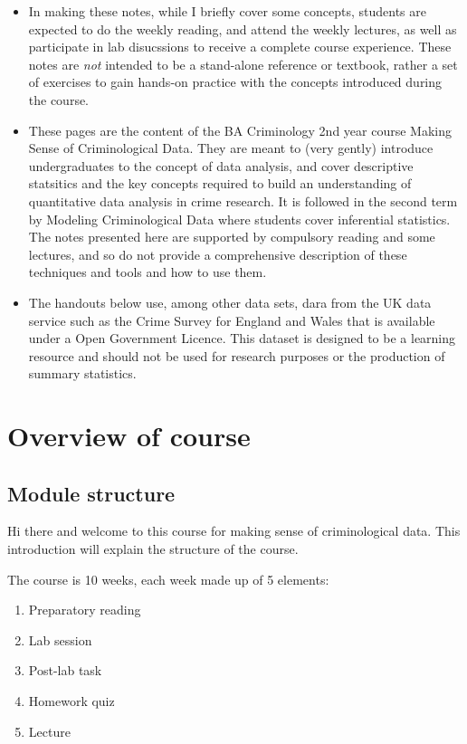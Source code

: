 \documentclass[]{book}
\providecommand{\tightlist}{%
  \setlength{\itemsep}{0pt}\setlength{\parskip}{0pt}}
\theoremstyle{definition}
\theoremstyle{definition}
\theoremstyle{definition}
\theoremstyle{remark}
\begin{document}
\begin{itemize}
\tightlist
\item
  In making these notes, while I briefly cover some concepts, students
  are expected to do the weekly reading, and attend the weekly lectures,
  as well as participate in lab disucssions to receive a complete course
  experience. These notes are \emph{not} intended to be a stand-alone
  reference or textbook, rather a set of exercises to gain hands-on
  practice with the concepts introduced during the course.
\item
  These pages are the content of the BA Criminology 2nd year course
  Making Sense of Criminological Data. They are meant to (very gently)
  introduce undergraduates to the concept of data analysis, and cover
  descriptive statsitics and the key concepts required to build an
  understanding of quantitative data analysis in crime research. It is
  followed in the second term by Modeling Criminological Data where
  students cover inferential statistics. The notes presented here are
  supported by compulsory reading and some lectures, and so do not
  provide a comprehensive description of these techniques and tools and
  how to use them.
\item
  The handouts below use, among other data sets, dara from the UK data
  service such as the Crime Survey for England and Wales that is
  available under a Open Government Licence. This dataset is designed to
  be a learning resource and should not be used for research purposes or
  the production of summary statistics.
\end{itemize}

\hypertarget{overview}{%
\section{Overview of course}\label{overview}}

\hypertarget{module-structure}{%
\subsection{Module structure}\label{module-structure}}

Hi there and welcome to this course for making sense of criminological
data. This introduction will explain the structure of the course.

The course is 10 weeks, each week made up of 5 elements:

\begin{enumerate}
\def\labelenumi{\arabic{enumi})}
\tightlist
\item
  Preparatory reading
\item
  Lab session
\item
  Post-lab task
\item
  Homework quiz
\item
  Lecture
\end{enumerate}
\end{document}
